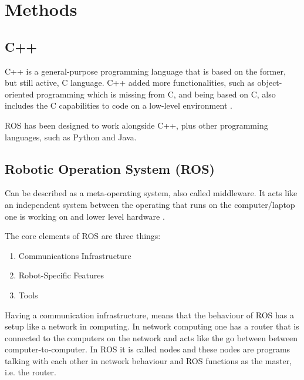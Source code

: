 \chapter{Methods}

\iffalse
Description of necessary hardware and software components. The project should at least feature 2 ROS nodes that are in communication with each other. And it should implement at least two functions. Usage of actual robot hardware is optional in this mini project.

I have splitted this into two chapters, "methods" and "implementation".
\fi

\section{C++}

C++ is a general-purpose programming language that is based on the former, but still active, C language. C++ added more functionalities, such as object-oriented programming which is missing from C, and being based on C, also includes the C capabilities to code on a low-level environment \cite{c++}.

ROS has been designed to work alongside C++, plus other programming languages, such as Python and Java.

\section{Robotic Operation System (ROS)}

Can be described as a meta-operating system, also called middleware. It acts like an independent system between the operating that runs on the computer/laptop one is working on and lower level hardware \cite{ros_core_components}.

The core elements of ROS are three things:
\begin{enumerate}
\setlength{\itemsep}{0.05\baselineskip}
    \item Communications Infrastructure
    \item  Robot-Specific Features
    \item Tools
\end{enumerate}

Having a communication infrastructure, means that the behaviour of ROS has a setup like a network in computing. In network computing one has a router that is connected to the computers on the network and acts like the go between between computer-to-computer. In ROS it is called nodes and these nodes are programs talking with each other in network behaviour and ROS functions as the master, i.e. the router.

